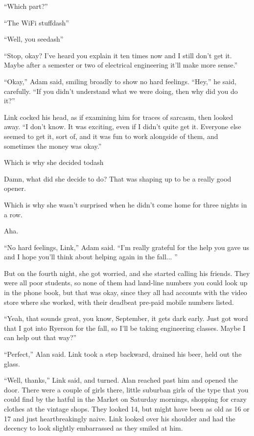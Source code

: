``Which part?''

``The WiFi stuffdash{}''

``Well, you seedash{}''

``Stop, okay?  I've heard you explain it ten times now and I still
don't get it.  Maybe after a semester or two of electrical engineering
it'll make more sense.''

``Okay,'' Adam said, smiling broadly to show no hard feelings. 
``Hey,'' he said, carefully.  ``If you didn't understand what we were
doing, then why did you do it?''

Link cocked his head, as if examining him for traces of sarcasm, then
looked away.  ``I don't know.  It was exciting, even if I didn't quite
get it.  Everyone else seemed to get it, sort of, and it was fun to
work alongside of them, and sometimes the money was okay.''

Which is why she decided todash{}

Damn, what did she decide to do?  That was shaping up to be a really
good opener.

Which is why she wasn't surprised when he didn't come home for three
nights in a row.

Aha.

``No hard feelings, Link,'' Adam said.  ``I'm really grateful for the
help you gave us and I hope you'll think about helping again in the
fall...  ''

But on the fourth night, she got worried, and she started calling his
friends.  They were all poor students, so none of them had land-line
numbers you could look up in the phone book, but that was okay, since
they all had accounts with the video store where she worked, with
their deadbeat pre-paid mobile numbers listed.

``Yeah, that sounds great, you know, September, it gets dark early. 
Just got word that I got into Ryerson for the fall, so I'll be taking
engineering classes.  Maybe I can help out that way?''

``Perfect,'' Alan said.  Link took a step backward, drained his beer,
held out the glass.

``Well, thanks,'' Link said, and turned.  Alan reached past him and
opened the door.  There were a couple of girls there, little suburban
girls of the type that you could find by the hatful in the Market on
Saturday mornings, shopping for crazy clothes at the vintage shops. 
They looked 14, but might have been as old as 16 or 17 and just
heartbreakingly naive.  Link looked over his shoulder and had the
decency to look slightly embarrassed as they smiled at him.

